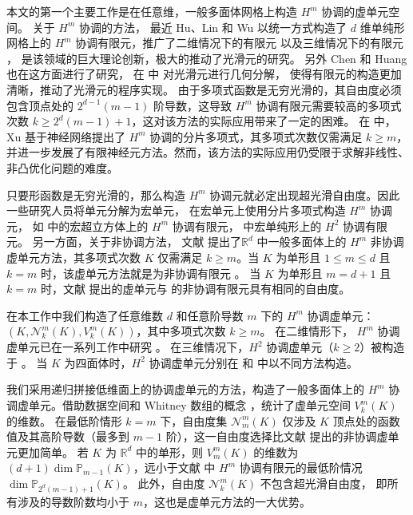 本文的第一个主要工作是在任意维，一般多面体网格上构造 $H^m$ 协调的虚单元空间。
关于 $H^m$ 协调的方法，
最近 Hu、Lin 和 Wu\cite{HuLinWu2021} 以统一方式构造了 $d$ 维单纯形网格上的 
$H^m$ 协调有限元，推广了二维情况下的有限元
\cite{BrambleZlamal1970,Zenisek1970,ArgyrisFriedScharpf1968}
以及三维情况下的有限元 \cite{Zenisek1974a,Zhang2009a,Zhang2016a}，
是该领域的巨大理论创新，极大的推动了光滑元的研究。
另外
Chen 和 Huang 也在这方面进行了研究，
在
\cite{ChenHuang2021Cmgeodecomp} 中
对光滑元进行几何分解，
使得有限元的构造更加清晰，推动了光滑元的程序实现。
由于多项式函数是无穷光滑的，其自由度必须包含顶点处的 $2^{d-1}(m-1)$
阶导数，这导致 $H^m$ 协调有限元需要较高的多项式次数 $k
\geq 2^d(m-1)+1$，这对该方法的实际应用带来了一定的困难。
在 \cite{Xu2020} 中，Xu 基于神经网络提出了
$H^m$ 协调的分片多项式，其多项式次数仅需满足 $k \geq
m$，并进一步发展了有限神经元方法。然而，该方法的实际应用仍受限于求解非线性、
非凸优化问题的难度。

只要形函数是无穷光滑的，那么构造 $H^m$
协调元就必定出现超光滑自由度。因此一些研究人员将单元分解为宏单元，
在宏单元上使用分片多项式构造 $H^m$ 协调元，
如 \cite{HuZhang2015a} 中的宏超立方体上的
$H^m$ 协调有限元，\cite{FuGuzmanNeilan2020} 中宏单纯形上的
$H^2$ 协调有限元。 
另一方面，关于非协调方法，
文献 \cite{ChenHuang2020,Huang2020} 提出了$\mathbb{R}^d$ 中一般多面体上的
$H^m$ 非协调虚单元方法，其多项式次数
$K$ 仅需满足 $k \geq m$。当 $K$ 为单形且 $1 \leq m \leq d$ 且 $k = m$
时，该虚单元方法就是为非协调有限元 \cite{WangXu2013,WangXu2006}。
当 $K$ 为单形且 $m = d+1$ 且 $k = m$ 时，文献 \cite{Huang2020} 提出的虚单元与
\cite{WuXu2019} 的非协调有限元具有相同的自由度。

在本工作中我们构造了任意维数 
$d$ 和任意阶导数 $m$ 下的 $H^m$ 协调虚单元：
$(K, \mathcal{N}_k^m(K), V_k^m(K))$，其中多项式次数 $k \geq m$。
在二维情形下，
$H^m$ 协调虚单元已在一系列工作中研究 \cite{BeiraoManzini2014,AntoniettiManziniVerani2020,AntoniettiManziniScacchiVerani2021,BrezziMarini2013}。
在三维情况下，$H^2$ 协调虚单元（$k \geq 2$）被构造于 \cite{BeiraodaVeigaDassiRusso2020}。
当 $K$ 为四面体时，$H^2$ 协调虚单元分别在 \cite{ChenHuang2022} 和 \cite{BrennerSung2019} 中以不同方法构造。

我们采用递归拼接低维面上的协调虚单元的方法，构造了一般多面体上的
$H^m$ 协调虚单元。借助数据空间和 Whitney 数组的概念
\cite{Verchota1990}，统计了虚单元空间 $V_k^m(K)$ 的维数。
在最低阶情形 $k = m$ 下，自由度集 $\mathcal{N}_m^m(K)$ 仅涉及 $K$ 顶点处的函数值及其高阶导数（最多到 $m-1$ 阶），这一自由度选择比文献 \cite{ChenHuang2020,Huang2020} 提出的非协调虚单元更加简单。
若 $K$ 为 $\mathbb{R}^d$ 中的单形，则 $V_m^m(K)$ 的维数为 $(d+1) \dim
\mathbb{P}_{m-1}(K)$，远小于文献 \cite{HuLinWu2021,ChenHuang2021Cmgeodecomp} 中
$H^m$ 协调有限元的最低阶情况 $\dim \mathbb{P}_{2^d(m-1)+1}(K)$。
此外，自由度 $\mathcal{N}_k^m(K)$ 不包含超光滑自由度，
即所有涉及的导数阶数均小于 $m$，这也是虚单元方法的一大优势。

